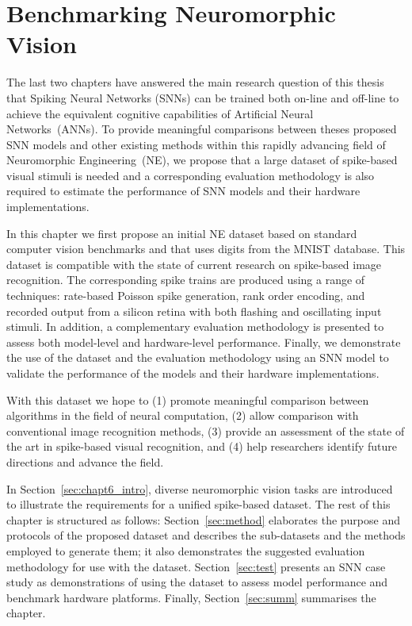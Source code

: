 \chapter{Benchmarking Neuromorphic Vision}
\label{cha:bench}


The last two chapters have answered the main research question of this thesis \protect{} that Spiking Neural Networks (SNNs) can be trained both on-line and off-line to achieve the equivalent cognitive capabilities of Artificial Neural Networks~(ANNs).
To provide meaningful comparisons between theses proposed SNN models and other existing methods within this rapidly advancing field of Neuromorphic Engineering~(NE), we propose that a large dataset of spike-based visual stimuli is needed and a corresponding evaluation methodology is also required to \protect{} estimate the \protect{} performance of SNN models and their hardware implementations.


In this chapter we first propose an initial NE dataset based on standard computer vision benchmarks and that uses digits from the MNIST database.
This dataset is compatible with the state of current research on spike-based image recognition.
The corresponding spike trains are produced using a range of techniques: rate-based Poisson spike generation, rank order encoding, and recorded output from a silicon retina with both flashing and oscillating input stimuli.
In addition, a complementary evaluation methodology is presented to assess both model-level and hardware-level performance.
Finally, we demonstrate the use of the dataset and the evaluation methodology using an SNN model to validate the performance of the models and their hardware implementations.

With this dataset we hope to (1) promote meaningful comparison between algorithms in the field of neural computation, (2) allow comparison with conventional image recognition methods, (3) provide an assessment of the state of the art in spike-based visual recognition, and (4) help researchers identify future directions and advance the field.

In Section~\ref{sec:chapt6_intro}, diverse neuromorphic vision tasks are introduced to illustrate the requirements for a unified spike-based dataset.
The rest of this chapter is structured as follows: Section~\ref{sec:method} elaborates the purpose and protocols of the proposed dataset and describes the sub-datasets and the methods employed to generate them; it also demonstrates the suggested evaluation methodology for use with the dataset.
Section~\ref{sec:test} presents an SNN case study as demonstrations of using the dataset to assess model performance and benchmark hardware platforms.
Finally, Section~\ref{sec:summ} summarises the chapter.

